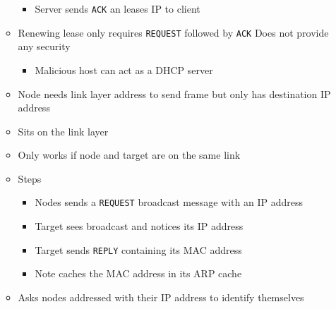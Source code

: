 \begin{itemize}
\begin{itemize}
\begin{itemize}
                     \item Server sends \verb+ACK+ an leases IP to client
                \end{itemize}
            \item Renewing lease only requires \verb+REQUEST+ followed by \verb+ACK+
            \icon Does not provide any security
                \begin{itemize}
                    \item Malicious host can act as a DHCP server
                \end{itemize}
        \end{itemize}
        \begin{itemize}
            \item Node needs link layer address to send frame but only has destination IP address
            \item Sits on the link layer
            \item Only works if node and target are on the same link
            \item Steps
                \begin{itemize}
                    \item Nodes sends a \verb+REQUEST+ broadcast message with an IP address
                    \item Target sees broadcast and notices its IP address
                    \item Target sends \verb+REPLY+ containing its MAC address
                    \item Note caches the MAC address in its ARP cache
                \end{itemize}
            \item Asks nodes addressed with their IP address to identify themselves
        \end{itemize}
\end{itemize}
